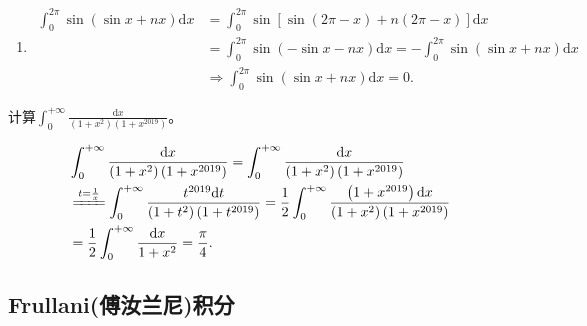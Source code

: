 \documentclass[../../main.tex]{subfiles}%
\begin{document}
\begin{solution}
\begin{enumerate}
\item\begin{align*}
\int_0^{2\pi}{\sin \left( \sin x+nx \right) \mathrm{d}x}&=\int_0^{2\pi}{\sin \left[ \sin \left( 2\pi -x \right) +n\left( 2\pi -x \right) \right] \mathrm{d}x}
\\
&=\int_0^{2\pi}{\sin \left( -\sin x-nx \right) \mathrm{d}x}=-\int_0^{2\pi}{\sin \left( \sin x+nx \right) \mathrm{d}x}
\\
&\Longrightarrow \int_0^{2\pi}{\sin \left( \sin x+nx \right) \mathrm{d}x}=0.
\end{align*} 
\end{enumerate}

\end{solution}

\begin{example}
计算$\int_{0}^{+\infty} \frac{\mathrm{d}x}{\left(1 + x^2\right)\left(1 + x^{2019}\right)}$。
\end{example}
\begin{solution}

\begin{align*}
&\int_0^{+\infty}{\frac{\mathrm{d}x}{\left( 1+x^2 \right) \left( 1+x^{2019} \right)}}=\int_0^{+\infty}{\frac{\mathrm{d}x}{\left( 1+x^2 \right) \left( 1+x^{2019} \right)}}
\\
&\xlongequal{t=\frac{1}{x}}\int_0^{+\infty}{\frac{t^{2019}\mathrm{d}t}{\left( 1+t^2 \right) \left( 1+t^{2019} \right)}}=\frac{1}{2}\int_0^{+\infty}{\frac{\left( 1+x^{2019} \right) \mathrm{d}x}{\left( 1+x^2 \right) \left( 1+x^{2019} \right)}}
\\
&=\frac{1}{2}\int_0^{+\infty}{\frac{\mathrm{d}x}{1+x^2}}=\frac{\pi}{4}.
\end{align*}

\end{solution}




\subsection{Frullani(傅汝兰尼)积分}
\end{document}
